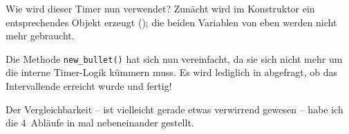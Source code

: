 Wie wird dieser Timer nun verwendet? Zunächt wird im Konstruktor ein entsprechendes Objekt erzeugt (); die beiden Variablen von eben werden nicht mehr gebraucht.


Die Methode \texttt{new\_bullet()} hat sich nun vereinfacht, da sie sich nicht mehr um die interne Timer-Logik kümmern muss. Es wird lediglich in  abgefragt, ob das Intervallende erreicht wurde und fertig!


Der Vergleichbarkeit -- ist vielleicht gerade etwas verwirrend gewesen -- habe ich die 4~Abläufe in  mal nebeneinander gestellt.

